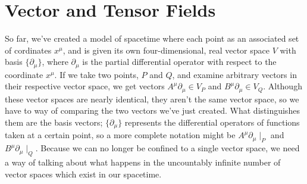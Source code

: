 \chapter{Vector and Tensor Fields}
So far, we've created a model of spacetime where each point as an associated set of cordinates $x^\mu$, and is given its own four-dimensional, real vector space $V$ with basis $\{\partial_\mu\}$, where $\partial_\mu$ is the partial differential operator with respect to the coordinate $x^\mu$.
If we take two points, $P$ and $Q$, and examine arbitrary vectors in their respective vector space, we get vectors $A^\mu \partial_\mu \in V_P$ and $B^\mu \partial_\mu \in V_Q$.
Although these vector spaces are nearly identical, they aren't the same vector space, so we have to way of comparing the two vectors we've just created.
What distinguishes them are the basis vectors; $\{\partial_\mu\}$ represents the differential operators of functions taken at a certain point, so a more complete notation might be $A^\mu \partial_\mu \mid_P$ and $B^\mu \partial_\mu \mid_Q$.
Because we can no longer be confined to a single vector space, we need a way of talking about what happens in the uncountably infinite number of vector spaces which exist in our spacetime.


